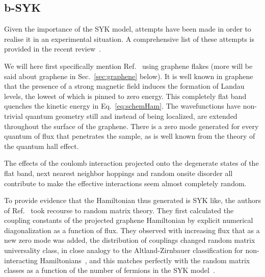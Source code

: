 \subsection{b-SYK}
\label{subsec:bSYK}
Given the importance of the SYK model, attempts have been made in order to realise it in an experimental situation. A comprehensive list of these attempts is provided in the recent review~\cite{chowdhury_sachdev-ye-kitaev_2021}. 

\par 
We will here first specifically mention Ref.~\cite{Chen2018} using graphene flakes (more will be said about graphene in Sec.~\ref{sec:graphene} below). It is well known in graphene that the presence of a strong magnetic field induces the formation of Landau levels, the lowest of which is pinned to zero energy. This completely flat band quenches the kinetic energy in Eq.~\ref{eq:schemHam}. The wavefunctions have non-trivial quantum geometry still and instead of being localized, are extended throughout the surface of the graphene. There is a zero mode generated for every quantum of flux that penetrates the sample, as is well known from the theory of the quantum hall effect. 

\par
The effects of the coulomb interaction projected onto the degenerate states of the flat band, next nearest neighbor hoppings and random onsite disorder all contribute to make the effective interactions seem almost completely random. 

\par
To provide evidence that the Hamiltonian thus generated is SYK like, the authors of  Ref.~\cite{Chen2018} took recourse to random matrix theory. They first calculated the coupling constants of the projected graphene Hamiltonian by explicit numerical diagonalization as a function of flux. They observed with increasing flux that as a new zero mode was added, the distribution of couplings changed random matrix universality class, in close analogy to the Altland-Zirnbauer classification for non-interacting Hamiltonians~\cite{altland1997nonstandard,fidkowski2010effects,fidkowski2011topological}, and this matches perfectly with the random matrix classes as a function of the number of fermions in the SYK model~\cite{garcia2016spectral,behrends2019tenfold,you2017sachdev}. 

